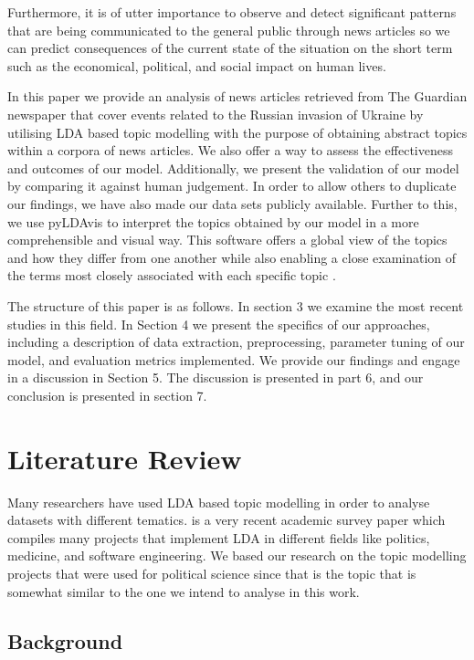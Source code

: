\documentclass[twoside,12pt,a4paper]{article}
\begin{document}
Furthermore, it is of utter importance to observe and detect significant patterns that are being communicated to the general public through news articles so we can predict consequences of the current state of the situation on the short term such as the economical, political, and social impact on human lives.

In this paper we provide an analysis of news articles retrieved from The Guardian newspaper that cover events related to the Russian invasion of Ukraine by utilising LDA based topic modelling with the purpose of obtaining abstract topics within a corpora of news articles. We also offer a way to assess the effectiveness and outcomes of our model. Additionally, we present the validation of our model by comparing it against human judgement. In order to allow others to duplicate our findings, we have also made our data sets publicly available. Further to this, we use pyLDAvis to interpret the topics obtained by our model in a more comprehensible and visual way. This software offers a global view of the topics and how they differ from one another while also enabling a close examination of the terms most closely associated with each specific topic \citep{sievert_ldavis_2014}.

The structure of this paper is as follows. In section 3 we examine the most recent studies in this field. In Section 4 we present the specifics of our approaches, including a description of data extraction, preprocessing, parameter tuning of our model, and evaluation metrics implemented. We provide our findings and engage in a discussion in Section 5. The discussion is presented in part 6, and our conclusion is presented in section 7.

\clearpage
\section{Literature Review}
Many researchers have used LDA based topic modelling in order to analyse datasets with different tematics. \citep{jelodar_latent_2019} is a very recent academic survey paper which compiles many projects that implement LDA in different fields like politics, medicine, and software engineering. We based our research on the topic modelling projects that were used for political science since that is the topic that is somewhat similar to the one we intend to analyse in this work. 

\subsection{Background}
\end{document}
